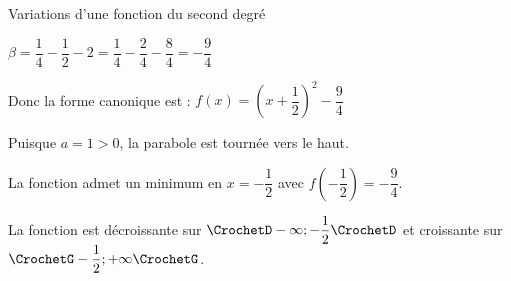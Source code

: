 \begin{EXO}{Variations d'une fonction du second degré}{}
\begin{tcbenumerate}[3]
$\beta = \dfrac{1}{4} - \dfrac{1}{2} - 2 = \dfrac{1}{4} - \dfrac{2}{4} - \dfrac{8}{4} = -\dfrac{9}{4}$

Donc la forme canonique est : $f(x) = \left(x + \dfrac{1}{2}\right)^2 - \dfrac{9}{4}$

\tcbitem Puisque $a = 1 > 0$, la parabole est tournée vers le haut.

La fonction admet un minimum en $x = -\dfrac{1}{2}$ avec $f\left(-\dfrac{1}{2}\right) = -\dfrac{9}{4}$.

La fonction est décroissante sur $\CrochetD-\infty ; -\dfrac{1}{2}\CrochetD$ et croissante sur $\CrochetG-\dfrac{1}{2} ; +\infty\CrochetG$.
\end{tcbenumerate}
\end{EXO}